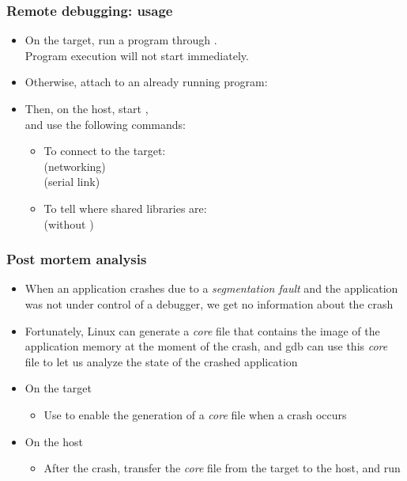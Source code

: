 \begin{frame}
  \frametitle{Remote debugging: usage}
  \begin{itemize}
  \item On the target, run a program through .\\
    Program execution will not start immediately.\\
  \item Otherwise, attach  to an already running program:\\
  \item Then, on the host, start ,\\
    and use the following  commands:
    \begin{itemize}
    \item To connect to the target:\\
       (networking)\\
       (serial link)
    \item To tell  where shared libraries are:\\
       (without )
    \end{itemize}
  \end{itemize}
\end{frame}

\begin{frame}
  \frametitle{Post mortem analysis}
  \begin{itemize}
  \item When an application crashes due to a {\em segmentation fault}
    and the application was not under control of a debugger, we get no
    information about the crash
  \item Fortunately, Linux can generate a {\em core} file that
    contains the image of the application memory at the moment of the
    crash, and gdb can use this {\em core} file to let us analyze the
    state of the crashed application
  \item On the target
    \begin{itemize}
    \item Use  to enable the generation of a
      {\em core} file when a crash occurs
    \end{itemize}
  \item On the host
    \begin{itemize}
    \item After the crash, transfer the {\em core} file from the target to
      the host, and run
    \end{itemize}
  \end{itemize}
\end{frame}


